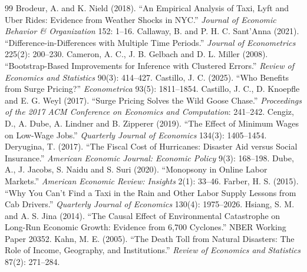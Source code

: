 \documentclass[11pt]{article}
\begin{document}
\clearpage
\begin{singlespace}
\begin{thebibliography}{99}
 Brodeur, A. and K. Nield (2018). ``An Empirical Analysis of Taxi, Lyft and Uber Rides: Evidence from Weather Shocks in NYC.'' \textit{Journal of Economic Behavior \& Organization} 152: 1--16.
 Callaway, B. and P. H. C. Sant'Anna (2021). ``Difference-in-Differences with Multiple Time Periods.'' \textit{Journal of Econometrics} 225(2): 200--230.
 Cameron, A. C., J. B. Gelbach and D. L. Miller (2008). ``Bootstrap-Based Improvements for Inference with Clustered Errors.'' \textit{Review of Economics and Statistics} 90(3): 414--427.
 Castillo, J. C. (2025). ``Who Benefits from Surge Pricing?'' \textit{Econometrica} 93(5): 1811--1854.
 Castillo, J. C., D. Knoepfle and E. G. Weyl (2017). ``Surge Pricing Solves the Wild Goose Chase.'' \textit{Proceedings of the 2017 ACM Conference on Economics and Computation}: 241--242.
 Cengiz, D., A. Dube, A. Lindner and B. Zipperer (2019). ``The Effect of Minimum Wages on Low-Wage Jobs.'' \textit{Quarterly Journal of Economics} 134(3): 1405--1454.
 Deryugina, T. (2017). ``The Fiscal Cost of Hurricanes: Disaster Aid versus Social Insurance.'' \textit{American Economic Journal: Economic Policy} 9(3): 168--198.
 Dube, A., J. Jacobs, S. Naidu and S. Suri (2020). ``Monopsony in Online Labor Markets.'' \textit{American Economic Review: Insights} 2(1): 33--46.
 Farber, H. S. (2015). ``Why You Can't Find a Taxi in the Rain and Other Labor Supply Lessons from Cab Drivers.'' \textit{Quarterly Journal of Economics} 130(4): 1975--2026.
 Hsiang, S. M. and A. S. Jina (2014). ``The Causal Effect of Environmental Catastrophe on Long-Run Economic Growth: Evidence from 6,700 Cyclones.'' NBER Working Paper 20352.
 Kahn, M. E. (2005). ``The Death Toll from Natural Disasters: The Role of Income, Geography, and Institutions.'' \textit{Review of Economics and Statistics} 87(2): 271--284.
\end{thebibliography}
\end{singlespace}
\end{document}
